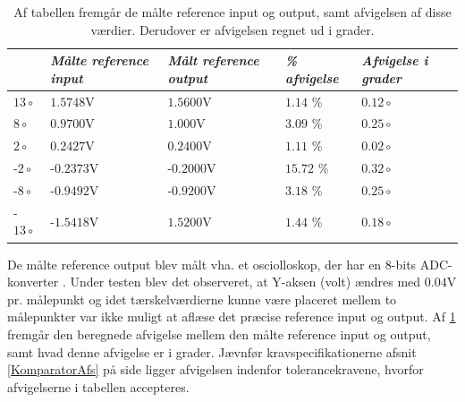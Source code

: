 \begin{table}[H]
\centering
\begin{tabular}{|l|l|l|l|l|}
\hline
           & \textit{Målte reference input} & \textit{Målt reference output} & \textit{\% afvigelse} & \textit{Afvigelse i grader} \\ \hline
$13\circ$  & $1.5748$V                      & $1.5600$V                      & $1.14$ \%             & $0.12\circ$                        \\ \hline
$8\circ$   & $0.9700$V                      & $1.000$V                       & $3.09$ \%             & $0.25\circ$                        \\ \hline
$2\circ$   & $0.2427$V                      & $0.2400$V                      & $1.11$ \%             & $0.02\circ$                        \\ \hline
-$2\circ$  & -$0.2373$V                     & -$0.2000$V                     & $15.72$ \%            & $0.32\circ$                        \\ \hline
-$8\circ$  & -$0.9492$V                     & -$0.9200$V                     & $3.18$ \%             & $0.25\circ$                        \\ \hline
-$13\circ$ & -$1.5418$V                     & $1.5200$V                      & $1.44$ \%             & $0.18\circ$                        \\ \hline
\end{tabular}
\caption{Af tabellen fremgår de målte reference input og output, samt afvigelsen af disse værdier. Derudover er afvigelsen regnet ud i grader.}
\label{Tab:test-taendsluk}
\end{table}

\noindent De målte reference output blev målt vha. et osciolloskop, der har en 8-bits ADC-konverter \cite{RIGOL2010}. Under testen blev det observeret, at Y-aksen (volt) ændres med $0.04$V pr. målepunkt og idet tærskelværdierne kunne være placeret mellem to målepunkter var ikke muligt at aflæse det præcise reference input og output. Af \ref{Tab:test-taendsluk} fremgår den beregnede afvigelse mellem den målte reference input og output, samt hvad denne afvigelse er i grader. Jævnfør kravspecifikationerne afsnit \ref{KomparatorAfs} på side \pageref{KomparatorAfs} ligger afvigelsen indenfor tolerancekravene, hvorfor afvigelserne i tabellen accepteres. 